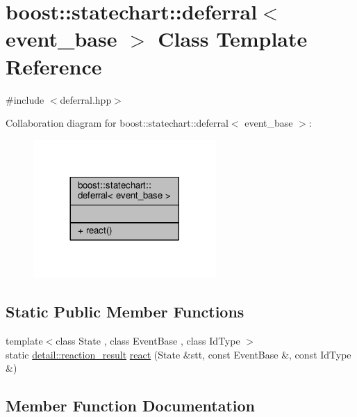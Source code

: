 \hypertarget{classboost_1_1statechart_1_1deferral_3_01event__base_01_4}{}\section{boost\+:\+:statechart\+:\+:deferral$<$ event\+\_\+base $>$ Class Template Reference}
\label{classboost_1_1statechart_1_1deferral_3_01event__base_01_4}


{\ttfamily \#include $<$deferral.\+hpp$>$}



Collaboration diagram for boost\+:\+:statechart\+:\+:deferral$<$ event\+\_\+base $>$\+:
\nopagebreak
\begin{figure}[H]
\begin{center}
\leavevmode
\includegraphics[width=197pt]{classboost_1_1statechart_1_1deferral_3_01event__base_01_4__coll__graph}
\end{center}
\end{figure}
\subsection*{Static Public Member Functions}
\begin{DoxyCompactItemize}
\item 
{\footnotesize template$<$class State , class Event\+Base , class Id\+Type $>$ }\\static \mbox{\hyperlink{namespaceboost_1_1statechart_1_1detail_ab091bbb4c29327fb46ee479ea1b7255b}{detail\+::reaction\+\_\+result}} \mbox{\hyperlink{classboost_1_1statechart_1_1deferral_3_01event__base_01_4_abce5ad466565afb17f0a210b651635bf}{react}} (State \&stt, const Event\+Base \&, const Id\+Type \&)
\end{DoxyCompactItemize}


\subsection{Member Function Documentation}
\mbox{\label{classboost_1_1statechart_1_1deferral_3_01event__base_01_4_abce5ad466565afb17f0a210b651635bf}} 
